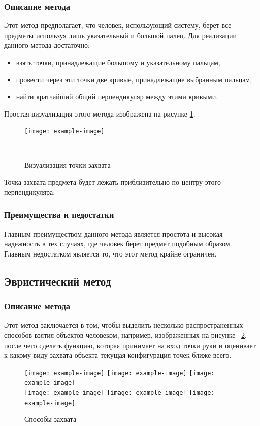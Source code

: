\documentclass[12pt, a4paper]{article}
\begin{document}
\subsubsection{Описание метода}
Этот метод предполагает, что человек, использующий систему, берет все предметы
используя лишь указательный и большой палец. Для реализации данного метода
достаточно:
\begin{itemize}
    \item взять точки, принадлежащие большому и указательному пальцам,
    \item провести через эти точки две кривые, принадлежащие выбранным пальцам,
    \item найти кратчайший общий перпендикуляр между этими кривыми.
\end{itemize}
Простая визуализация этого метода изображена на рисунке \ref{fig:basic_gripping_simple_model}.
\begin{figure}[h!]
    \centering
    \texttt{[image: example-image]}
    \caption{Визуализация точки захвата}
~\label{fig:basic_gripping_simple_model}
\end{figure}
Точка захвата предмета будет лежать приблизительно по центру этого перпендикуляра.
\subsubsection{Преимущества и недостатки}
Главным преимуществом данного метода является простота и высокая надежность в тех случаях, где человек берет предмет подобным образом.
Главным недостатком является то, что этот метод крайне ограничен.

\subsection{Эвристический метод}
\subsubsection{Описание метода}
Этот метод заключается в том, чтобы выделить несколько распространенных способов
взятия объектов человеком, например, изображенных на рисунке
~\ref{fig:heuristic_gripping_variants}, после чего сделать функцию, которая
принимает на вход точки руки и оценивает к какому виду захвата объекта текущая
конфигурация точек ближе всего.

\begin{figure}
    \texttt{[image: example-image]}\hfill
    \texttt{[image: example-image]}\hfill
    \texttt{[image: example-image]}
    \\[\smallskipamount]
    \texttt{[image: example-image]}\hfill
    \texttt{[image: example-image]}\hfill
    \texttt{[image: example-image]}
    \caption{Способы захвата}
\label{fig:heuristic_gripping_variants}
\end{figure}
\end{document}
